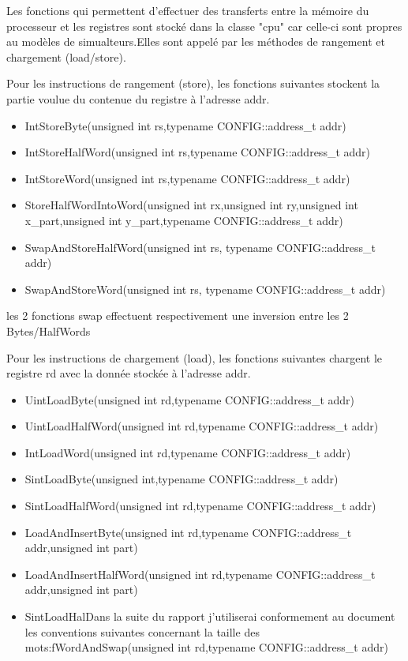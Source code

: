Les fonctions qui permettent d'effectuer des transferts entre la mémoire du processeur et les registres sont stocké dans la classe "cpu" car celle-ci sont propres
au modèles de simualteurs.Elles sont appelé par les méthodes de rangement et chargement (load/store). 

Pour les instructions de rangement (store), les fonctions suivantes stockent la partie voulue du contenue du registre à l'adresse addr. 

\begin{itemize}
\item IntStoreByte(unsigned int rs,typename CONFIG::address\_t addr)
\item IntStoreHalfWord(unsigned int rs,typename CONFIG::address\_t addr)
\item IntStoreWord(unsigned int rs,typename CONFIG::address\_t addr)
\item StoreHalfWordIntoWord(unsigned int rx,unsigned int ry,unsigned int x\_part,unsigned int y\_part,typename CONFIG::address\_t addr)
\item SwapAndStoreHalfWord(unsigned int rs, typename CONFIG::address\_t addr)
\item SwapAndStoreWord(unsigned int rs, typename CONFIG::address\_t addr)
\end{itemize}

les 2 fonctions swap effectuent respectivement une inversion entre les 2 Bytes/HalfWords

Pour les instructions de chargement (load), les fonctions suivantes chargent le registre rd avec la donnée stockée à l'adresse addr.

\begin{itemize}
\item UintLoadByte(unsigned int rd,typename CONFIG::address\_t addr)
\item UintLoadHalfWord(unsigned int rd,typename CONFIG::address\_t addr)
\item IntLoadWord(unsigned int rd,typename CONFIG::address\_t addr)
\item SintLoadByte(unsigned int,typename CONFIG::address\_t addr)
\item SintLoadHalfWord(unsigned int rd,typename CONFIG::address\_t addr)
\item LoadAndInsertByte(unsigned int rd,typename CONFIG::address\_t addr,unsigned int part)
\item LoadAndInsertHalfWord(unsigned int rd,typename CONFIG::address\_t addr,unsigned int part)
\item SintLoadHalDans la suite du rapport j'utiliserai conformement au document les conventions suivantes concernant la taille des mots:fWordAndSwap(unsigned int rd,typename CONFIG::address\_t addr)
\end{itemize}

